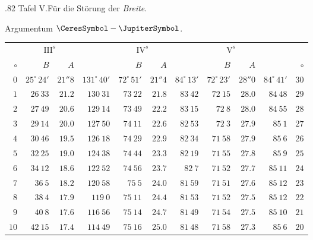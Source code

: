 \clearpage
\thispagestyle{empty}
\noindent{}%
\par\nobreak\smallskip
\begin{GaussVICeresFrame}{.82}
Tafel V.\enspace Für die Störung der \textit{Breite}.\par Argumentum $\CeresSymbol-\JupiterSymbol$.\par\medskip
{\fontsize{9}{11}\selectfont\setlength{\tabcolsep}{2.3pt}\renewcommand{\arraystretch}{1.08}
\begin{tabular}{r@{\GaussVICeresRule}r|r|r@{\GaussVICeresRule}r|r|r@{\GaussVICeresRule}r|r|r@{\GaussVICeresRule}r}
 & \multicolumn{2}{c|}{$\mathrm{III}^s$} &  & \multicolumn{2}{c|}{$\mathrm{IV}^s$} &  & \multicolumn{2}{c|}{$\mathrm{V}^s$} &  & \\
$\circ$ & $B$ & $A$ &  & $B$ & $A$ &  & $B$ & $A$ &  & $\circ$ \\\hline
$0$ & $25^\circ\,24'$ & $21''8$ & $131^\circ\,40'$ & $72^\circ\,51'$ & $21''4$ & $84^\circ\,13'$ & $72^\circ\,23'$ & $28''0$ & $84^\circ\,41'$ & $30$ \\
$1$ & $26\ 33$ & $21.2$ & $130\ 31$ & $73\ 22$ & $21.8$ & $83\ 42$ & $72\ 15$ & $28.0$ & $84\ 48$ & $29$ \\
$2$ & $27\ 49$ & $20.6$ & $129\ 14$ & $73\ 49$ & $22.2$ & $83\ 15$ & $72\ 8$ & $28.0$ & $84\ 55$ & $28$ \\
$3$ & $29\ 14$ & $20.0$ & $127\ 50$ & $74\ 11$ & $22.6$ & $82\ 53$ & $72\ 3$ & $27.9$ & $85\ 1$ & $27$ \\
$4$ & $30\ 46$ & $19.5$ & $126\ 18$ & $74\ 29$ & $22.9$ & $82\ 34$ & $71\ 58$ & $27.9$ & $85\ 6$ & $26$ \\
$5$ & $32\ 25$ & $19.0$ & $124\ 38$ & $74\ 44$ & $23.3$ & $82\ 19$ & $71\ 55$ & $27.8$ & $85\ 9$ & $25$ \\[3pt]
$6$ & $34\ 12$ & $18.6$ & $122\ 52$ & $74\ 56$ & $23.7$ & $82\ 7$ & $71\ 52$ & $27.7$ & $85\ 11$ & $24$ \\
$7$ & $36\ 5$ & $18.2$ & $120\ 58$ & $75\ 5$ & $24.0$ & $81\ 59$ & $71\ 51$ & $27.6$ & $85\ 12$ & $23$ \\
$8$ & $38\ 4$ & $17.9$ & $119\ 0$ & $75\ 11$ & $24.4$ & $81\ 53$ & $71\ 52$ & $27.5$ & $85\ 12$ & $22$ \\
$9$ & $40\ 8$ & $17.6$ & $116\ 56$ & $75\ 14$ & $24.7$ & $81\ 49$ & $71\ 54$ & $27.5$ & $85\ 10$ & $21$ \\
$10$ & $42\ 15$ & $17.4$ & $114\ 49$ & $75\ 16$ & $25.0$ & $81\ 48$ & $71\ 58$ & $27.3$ & $85\ 6$ & $20$ \\[3pt]

\end{tabular}}
\end{GaussVICeresFrame}
